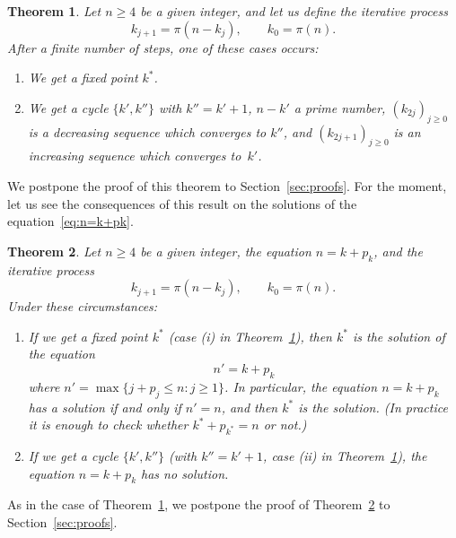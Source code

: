 \documentclass[12pt,reqno]{article}
\newtheorem{theorem}{Theorem}
\begin{document}
\begin{theorem}
\label{theo:iter}
Let $n \ge 4 $ be a given integer, and let us define the iterative process
\begin{equation}
\label{eq:iter}
  k_{j+1} = \pi(n-k_j), \qquad k_0 = \pi(n).
\end{equation}
After a finite number of steps, one of these cases occurs:
\begin{enumerate}
\item[(i)] We get a fixed point $k^{*}$.
\item[(ii)] We get a cycle $\{k',k''\}$ with $k'' = k'+1$, $n-k'$ a prime number, $(k_{2j})_{j\ge0}$ is a decreasing sequence which converges to $k''$, and $(k_{2j+1})_{j\ge0}$ is an increasing sequence which converges to~$k'$.
\end{enumerate}
\end{theorem}

We postpone the proof of this theorem to Section~\ref{sec:proofs}.
For the moment, let us see the consequences of this result on the solutions of the equation~\eqref{eq:n=k+pk}.

\begin{theorem}
\label{theo:sol}
Let $n \ge 4$ be a given integer, the equation $n = k + p_k$,
and the iterative process
\begin{equation*}
  k_{j+1} = \pi(n-k_j), \qquad k_0 = \pi(n).
\end{equation*}
Under these circumstances:
\begin{enumerate}
\item[(i)] If we get a fixed point $k^{*}$ (case (i) in Theorem~\ref{theo:iter}), then $k^{*}$ is the solution of the equation
\[
  n' = k + p_k
\]
where $n' = \max\{ j + p_j \le n : j \ge 1\}$. 
In particular, the equation $n = k + p_k$ has a solution if and only if $n'=n$, 
and then $k^{*}$ is the solution.
(In practice it is enough to check whether $k^{*} + p_{k^{*}} = n$ or not.)
\item[(ii)] If we get a cycle $\{k',k''\}$ (with $k''=k'+1$, case (ii) in Theorem~\ref{theo:iter}), the equation $n = k + p_k$ has no solution.
\end{enumerate}
\end{theorem}

As in the case of Theorem~\ref{theo:iter}, we postpone the proof of Theorem~\ref{theo:sol} to Section~\ref{sec:proofs}.
\end{document}
